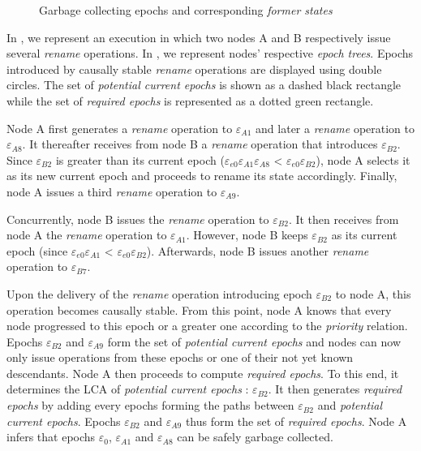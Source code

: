 \documentclass[10pt,journal,compsoc]{IEEEtran}
\let\MYoriglatexcaption\caption
\renewcommand{\caption}[2][\relax]{\MYoriglatexcaption[#2]{#2}}
\newcommand{\epoch}[1]{$\varepsilon_{#1}$}
\begin{document}
\begin{figure}[!ht]
{\begin{minipage}{\linewidth}
            \label{fig:GC-epoch-trees}
        \end{minipage}}
    \caption{Garbage collecting epochs and corresponding \emph{former states}}
    \label{fig:GC-epochs}
\end{figure}

In , we represent an execution in which two nodes A and B respectively issue several \emph{rename} operations.
In , we represent nodes' respective \emph{epoch trees}.
Epochs introduced by causally stable \emph{rename} operations are displayed using double circles.
The set of \emph{potential current epochs} is shown as a dashed black rectangle while the set of \emph{required epochs} is represented as a dotted green rectangle.

Node A first generates a \emph{rename} operation to \epoch{A1} and later a \emph{rename} operation to \epoch{A8}.
It thereafter receives from node B a \emph{rename} operation that introduces \epoch{B2}.
Since \epoch{B2} is greater than its current epoch (\epoch{e0}\epoch{A1}\epoch{A8} < \epoch{e0}\epoch{B2}), node A selects it as its new current epoch and proceeds to rename its state accordingly.
Finally, node A issues a third \emph{rename} operation to \epoch{A9}.

Concurrently, node B issues the \emph{rename} operation to \epoch{B2}.
It then receives from node A the \emph{rename} operation to \epoch{A1}.
However, node B keeps \epoch{B2} as its current epoch (since \epoch{e0}\epoch{A1} < \epoch{e0}\epoch{B2}).
Afterwards, node B issues another \emph{rename} operation to \epoch{B7}.

Upon the delivery of the \emph{rename} operation introducing epoch \epoch{B2} to node A, this operation becomes causally stable.
From this point, node A knows that every node progressed to this epoch or a greater one according to the \emph{priority} relation.
Epochs \epoch{B2} and \epoch{A9} form the set of \emph{potential current epochs} and nodes can now only issue operations from these epochs or one of their not yet known descendants.
Node A then proceeds to compute \emph{required epochs}.
To this end, it determines the \ac{LCA} of \emph{potential current epochs} : \epoch{B2}.
It then generates \emph{required epochs} by adding every epochs forming the paths between \epoch{B2} and \emph{potential current epochs}.
Epochs \epoch{B2} and \epoch{A9} thus form the set of \emph{required epochs}.
Node A infers that epochs \epoch{0}, \epoch{A1} and \epoch{A8} can be safely garbage collected.
\end{document}
